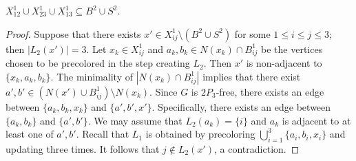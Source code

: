 \documentclass[11pt]{article}
\begin{document}
\begin{claim}\label{clm:P3(0)} 
	
	
	$X^1_{12}\cup X^1_{23}\cup X^1_{13}\subseteq B^2\cup S^2. 
	$
\end{claim}
\begin{proof}
	Suppose that there exists $ x'  \in  X^1_{ij}\setminus (B^2\cup S^2) $ for some $1\leq i\leq j\leq 3$; then $ |L_2(x')|=3 $. Let $ x_k\in X^1_{ij} $ and $ a_k,b_k\in N(x_k)  \cap  B^1_{ij} $ be the vertices chosen to be precolored in the step creating $L_2$. Then $ x' $ is non-adjacent to $ \{x_k,a_k,b_k\} $. The minimality of $ |N(x_k) \cap B^1_{ij}| $
	implies that there exist $ a',b' \in (N(x')\cup B^1_{ij})\setminus N(x_k) $.  
Since $G$ is $2P_3$-free, there exists an edge between $ \{a_k,b_k,x_k\} $ and $ \{a',b',x'\} $. Specifically, there exists an edge between $\{a_k,b_k\}$ and $\{a',b'\}$. We may assume that $L_2(a_k)=\{i\}$ and $a_k$ is adjacent to at least one of $a',b'$. Recall that $L_1$ is obtained by precoloring $ \bigcup\limits_{i=1}^3 \{a_i,b_i,x_i\} $
and updating three times. It follows that $j\notin L_2(x')$, a contradiction. 
\end{proof}



	



\end{document}

